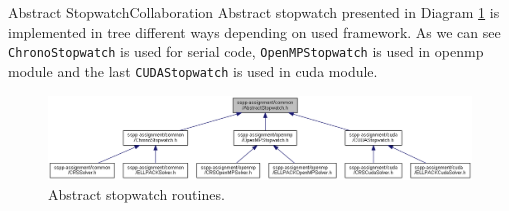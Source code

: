 		\begin{design-element}{Abstract Stopwatch}{Collaboration}
			Abstract stopwatch presented in Diagram \ref{fig:abstract-stopwatch} is implemented in tree different ways depending on used framework. As we can see \texttt{ChronoStopwatch} is used for serial code, \texttt{OpenMPStopwatch} is used in \gls{openmp} module and the last \texttt{CUDAStopwatch} is used in \gls{cuda} module.
			\begin{figure}[!hp]
				\centering
				\includegraphics[width=\textwidth]{others/img/abstract-stopwatch-calls}
				\caption{Abstract stopwatch routines.}
				\label{fig:abstract-stopwatch}
			\end{figure}
		\end{design-element}

